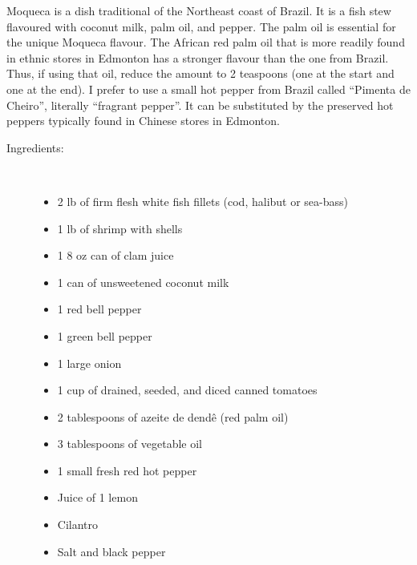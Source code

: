 \documentclass[11pt,letterpaper]{article}
\begin{document}


Moqueca is a dish traditional of the Northeast coast of Brazil. It is
a fish stew flavoured with coconut milk, palm oil, and pepper. The palm
oil is essential for the unique Moqueca flavour. The African red palm
oil that is more readily found in ethnic stores in Edmonton has a
stronger flavour than the one from Brazil. Thus, if using that oil,
reduce the amount to 2 teaspoons (one at the start and one at the
end). I prefer to use a small hot pepper from Brazil called ``Pimenta
de Cheiro'', literally ``fragrant pepper''. It can be substituted by the
preserved hot peppers typically found in Chinese stores in Edmonton.

\vspace{0.3in}

\begin{description}

\item[Ingredients:]\ \\
	\begin{itemize}
	\item 2 lb of firm flesh white fish fillets (cod, halibut or sea-bass)
	\item 1 lb of shrimp with shells
	\item 1 8 oz can of clam juice
	\item 1 can of unsweetened coconut milk
	\item 1 red bell pepper
	\item 1 green bell pepper
	\item 1 large onion
	\item 1 cup of drained, seeded, and diced canned tomatoes
	\item 2 tablespoons of azeite de dend\^{e} (red palm oil) 
	\item 3 tablespoons of vegetable oil
	\item 1 small fresh red hot pepper
	\item Juice of 1 lemon
	\item Cilantro
	\item Salt and black pepper
	\end{itemize}


\end{description}
\end{document}
